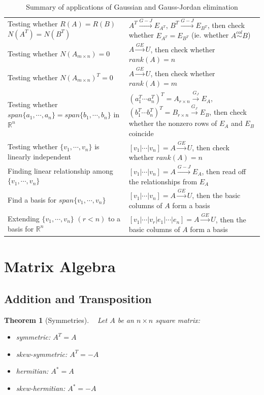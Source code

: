 \documentclass[10.5pt]{article}
\newtheorem{theo}{Theorem}
\begin{document}
\begin{table}[H]
\begin{tabularx}{\textwidth}{X|X}
Testing whether $R(A)=R(B)$ $N(A^T)=N(B^T)$ & $A^T\xrightarrow{G-J}E_{A^T}$, $B^T\xrightarrow{G-J}E_{B^{T}}$, then check whether $E_{A^T}=E_{B^T}$ (ie. whether $A\overset{col}{\sim}B$) \\
Testing whether $N(A_{m\times n})={0}$ & $A\xrightarrow{GE}U$, then check whether $rank(A)=n$ \\
Testing whether $N(A_{m\times n})^T={0}$ & $A\xrightarrow{GE}U$, then check whether $rank(A)=m$ \\
Testing whether $span\{a_1,\cdots ,a_n\}=span\{b_1,\cdots ,b_n\}$ in $\mathbb{R}^n$ & $(a_1^T \cdots a_n^T)^T=A_{r\times n}\xrightarrow{G_J}E_A$, $(b_1^T \cdots b_n^T)^T=B_{r\times n}\xrightarrow{G_J}E_B$, then check whether the nonzero rows of $E_A$ and $E_B$ coincide \\
Testing whether $\{v_1,\cdots ,v_n\}$ is linearly independent & $[v_1|\cdots |v_n]=A\xrightarrow{GE}U$, then check whether $rank(A)=n$\\
Finding linear relationship among $\{v_1,\cdots ,v_n\}$ & $[v_1|\cdots |v_n]=A\xrightarrow{G-J}E_A$, then read off the relationships from $E_A$ \\
Find a basis for $span\{v_1,\cdots ,v_n \}$ & $[v_1|\cdots |v_n]=A\xrightarrow{GE}U$, then the basic columns of $A$ form a basis\\
Extending $\{v_1,\cdots ,v_n\}$ $(r<n)$ to a basis for $\mathbb{R}^n$ & $[v_1|\cdots |v_r|e_1|\cdots |e_n]=A\xrightarrow{GE}U$, then the basic columns of $A$ form a basis
\end{tabularx}
\caption{Summary of applications of Gaussian and Gauss-Jordan elimination}
\end{table}
\pagebreak
\section{Matrix Algebra}
\subsection{Addition and Transposition}
\begin{theo}[Symmetries]
~ Let $A$ be an $n\times n$ square matrix:
\begin{itemize}
\item symmetric: $A^T=A$
\item skew-symmetric: $A^T=-A$
\item hermitian: $A^*=A$
\item skew-hermitian: $A^*=-A$
\end{itemize}
\end{theo}
\end{document}
